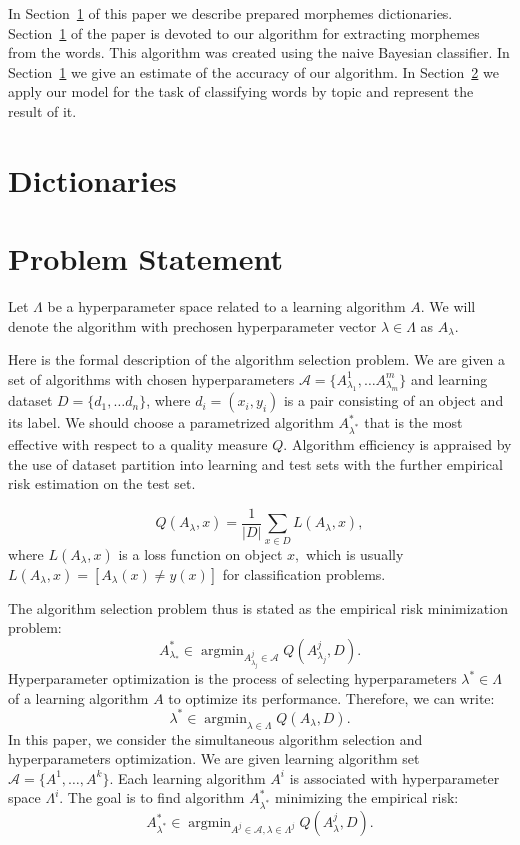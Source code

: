 \documentclass{svproc}
\DeclareMathOperator*{\argmin}{argmin}
\begin{document}
In Section~\ref{sec:dictionaries} of this paper we describe prepared morphemes dictionaries. Section~\ref{sec:dictionaries} of the paper is devoted to our algorithm for extracting morphemes from the words. This algorithm was created using the naive Bayesian classifier. In Section~\ref{sec:dictionaries} we give an estimate of the accuracy of our algorithm. In Section~\ref{sec:problem} we apply our model for the task of classifying words by topic and represent the result of it.


\section{Dictionaries}
\label{sec:dictionaries}


\section{Problem Statement}
\label{sec:problem}

Let $\Lambda$ be a hyperparameter space related to a learning algorithm $A$. We will denote the algorithm with prechosen hyperparameter vector $\lambda \in \Lambda$ as $A_{\lambda}$.

Here is the formal description of the algorithm selection problem. We are given a set of algorithms with chosen hyperparameters $\mathcal{A} = \{A^1_{\lambda_1}, \dots A^m_{\lambda_m}\}$ and learning dataset $D = \{d_1, \dots d_n\}$, where $d_i = (x_i, y_i)$ is a pair consisting of an object and its label. We should choose a parametrized algorithm  $A^*_{\lambda^*}$ that is the most effective with respect to a quality measure $Q$. Algorithm efficiency is appraised by the use of dataset partition into learning and test sets with the further empirical risk estimation on the test set. 

\[
Q(A_{\lambda}, x) = \frac {1} {|D|} \sum_{x \in D} L(A_{\lambda}, x),
\]
where $L(A_{\lambda}, x)$ is a loss function on object $x,$ which is usually $L(A_{\lambda}, x) = [A_{\lambda}(x) \neq y(x)]$
for classification problems.

The algorithm selection problem thus is stated as the empirical risk minimization problem:
\[
A^*_{\lambda_*} \in \argmin_{A^j_{\lambda_j} \in \mathcal{A}} Q(A^j_{\lambda_j}, D).
\]
Hyperparameter optimization is the process of selecting hyperparameters $\lambda^* \in \Lambda$ of a learning algorithm $A$ to optimize its performance. Therefore, we can write:
\[
\lambda^* \in \argmin_{\lambda \in \Lambda} Q(A_{\lambda}, D).
\]
In this paper, we consider the simultaneous algorithm selection and hyperparameters optimization. We are given learning algorithm set $\mathscr{A}=\{A^1, \dots , A^k\}.$ Each learning algorithm $A^i$ is associated with hyperparameter space $\Lambda^i$. The goal is to find algorithm $A^*_{\lambda^*}$ minimizing the empirical risk:
\[
A^*_{\lambda^*} \in \argmin_{A^j \in \mathscr{A}, \lambda \in \Lambda^j} Q(A_{\lambda}^j, D).
\]
\end{document}

